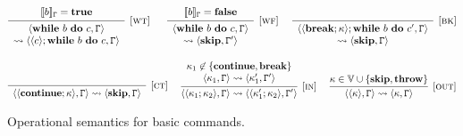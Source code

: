 \begin{figure}[t]
$$
\infer[{[\rname{wt}]}]
{
	\begin{array}{c}
	\conf{\whiles{b}{c},\cstate}
	\\
	 \leadsto \conf{\conf{c};\whiles{b}{c},\cstate}
	\end{array}
}
{
	\begin{array}{c}
	\eval{b}_{\cstate} = \textbf{true}
	\end{array}
}
~~~~~
\infer[{[\rname{wf}]}]
{
	\begin{array}{c}
	\conf{\whiles{b}{c},\cstate} \\
	\leadsto
	\conf{\textbf{skip},\cstate'}
	\end{array}
}
{
	\begin{array}{c}
	\eval{b}_{\cstate} = \textbf{false}
	\end{array}
}
~~~~
\infer[{[\rname{bk}]}]{
	\begin{array}{c}
	\conf{\conf{\textbf{break};\kappa};\whiles{b}{c'},\cstate} 
	\\
	\leadsto \conf{\textbf{skip},\cstate}
	\end{array}
}{
}
$$

$$
\infer[{[\rname{ct}]}]{
	\begin{array}{c}
	\conf{\conf{\textbf{continue};\kappa},\cstate}
	\leadsto \conf{\textbf{skip},\cstate}
	\end{array}
}{}
~~~~
\infer[{[\rname{in}]}]{\conf{\conf{\kappa_1;\kappa_2},\cstate} \leadsto \conf{\conf{\kappa_1';\kappa_2},\cstate'}}
{
	\begin{array}{c}
	\kappa_1 \not \in \{\textbf{continue},\textbf{break}\}
	\\
	\conf{\kappa_1,\cstate} \leadsto \conf{\kappa_1',\cstate'}
	\end{array}
}
~~~~
\infer[{[\rname{out}]}]{\conf{\conf{\kappa},\cstate} \leadsto \conf{\kappa,\cstate}}{ \kappa \in \mathbb{V} \cup \{\textbf{skip},\textbf{throw}\}}
$$
\caption{Operational semantics for basic commands.}\label{fig:opbasic}
\end{figure}

